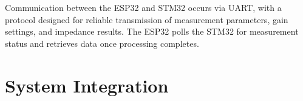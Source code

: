 Communication between the ESP32 and STM32 occurs via UART, with a protocol designed for reliable transmission of measurement parameters, gain settings, and impedance results. The ESP32 polls the STM32 for measurement status and retrieves data once processing completes.

\section{System Integration}

\label{chap:design}